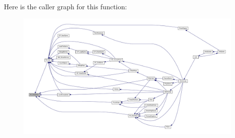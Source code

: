 Here is the caller graph for this function:
\nopagebreak
\begin{figure}[H]
\begin{center}
\leavevmode
\includegraphics[width=400pt]{ID__IN_8H_a50a122900022f7051ec64d5c4613ebcf_icgraph}
\end{center}
\end{figure}


